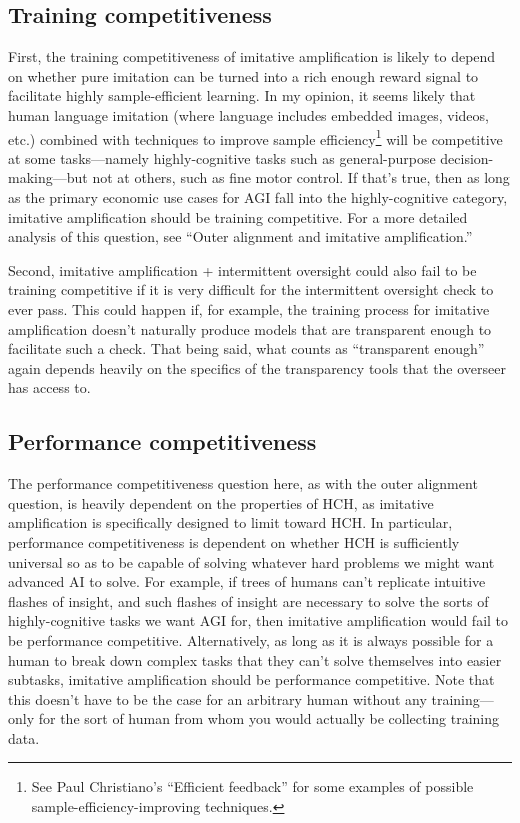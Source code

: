 \documentclass[
  onecolumn,
  natbib,
]{miri-tech-article}
\begin{document}
\subsection{Training competitiveness} First, the training competitiveness of imitative amplification is likely to depend on whether pure imitation can be turned into a rich enough reward signal to facilitate highly sample-efficient learning. In my opinion, it seems likely that human language imitation (where language includes embedded images, videos, etc.) combined with techniques to improve sample efficiency\footnote{See Paul Christiano's ``Efficient feedback''\cite{efficient_feedback} for some examples of possible sample-efficiency-improving techniques.} will be competitive at some tasks---namely highly-cognitive tasks such as general-purpose decision-making---but not at others, such as fine motor control. If that's true, then as long as the primary economic use cases for AGI fall into the highly-cognitive category, imitative amplification should be training competitive. For a more detailed analysis of this question, see ``Outer alignment and imitative amplification.''\cite{outer_alignment}

Second, imitative amplification + intermittent oversight could also fail to be training competitive if it is very difficult for the intermittent oversight check to ever pass. This could happen if, for example, the training process for imitative amplification doesn't naturally produce models that are transparent enough to facilitate such a check. That being said, what counts as ``transparent enough'' again depends heavily on the specifics of the transparency tools that the overseer has access to.

\subsection{Performance competitiveness} The performance competitiveness question here, as with the outer alignment question, is heavily dependent on the properties of HCH, as imitative amplification is specifically designed to limit toward HCH. In particular, performance competitiveness is dependent on whether HCH is sufficiently universal so as to be capable of solving whatever hard problems we might want advanced AI to solve. For example, if trees of humans can't replicate intuitive flashes of insight, and such flashes of insight are necessary to solve the sorts of highly-cognitive tasks we want AGI for, then imitative amplification would fail to be performance competitive. Alternatively, as long as it is always possible for a human to break down complex tasks that they can't solve themselves into easier subtasks, imitative amplification should be performance competitive. Note that this doesn't have to be the case for an arbitrary human without any training---only for the sort of human from whom you would actually be collecting training data.
\end{document}
